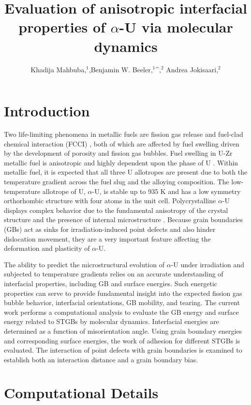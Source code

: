 \documentclass{anstrans}
\title{Evaluation of anisotropic interfacial properties of $\alpha$-U via molecular dynamics}
\author{Khadija Mahbuba,$^{1}$,Benjamin W. Beeler,$^{1}$^,$^{2}$ Andrea Jokisaari,$^{2}$ }
\institute{
$^{1}$North Carolina State University, Department of Nuclear Engineering, Raleigh, NC 27607
\and
$^{2}$Fuel Modeling and Simulation Department, Idaho National Laboratory, Idaho Falls, ID 83415

}
\begin{document}
\section{Introduction}
Two life-limiting phenomena in metallic fuels are fission gas release and fuel-clad chemical interaction (FCCI) \cite{carmack2009}, both of which are affected by fuel swelling driven by the development of porosity and fission gas bubbles. Fuel swelling in U-Zr metallic fuel is anisotropic and highly dependent upon the phase of U \cite{hofman2015}. Within metallic fuel, it is expected that all three U allotropes are present due to both the temperature gradient across the fuel slug and the alloying composition. The low-temperature allotrope of U, $\alpha$-U, is stable up to 935 K \cite{hofman1996} and has a low symmetry orthorhombic structure with four atoms in the unit cell. Polycrystalline $\alpha$-U displays complex behavior due to the fundamental anisotropy of the crystal structure and the presence of internal microstructure \cite{barrett2020}. Because grain boundaries (GBs) act as sinks for irradiation-induced point defects and also hinder dislocation movement, they are a very important feature affecting the deformation and plasticity of $\alpha$-U.

The ability to predict the microstructural evolution of $\alpha$-U under irradiation and subjected to temperature gradients relies on an accurate understanding of interfacial properties, including GB and surface energies. Such energetic properties can serve to provide fundamental insight into the expected fission gas bubble behavior, interfacial orientations, GB mobility, and tearing. The current work performs a computational analysis to evaluate the GB energy and surface energy related to STGBs by molecular dynamics. Interfacial energies are determined as a function of misorientation angle. Using grain boundary energies and corresponding surface energies, the work of adhesion for different STGBs is evaluated. The interaction of point defects with grain boundaries is examined to establish both an interaction distance and a grain boundary bias.


\section{Computational Details}
\end{document}
